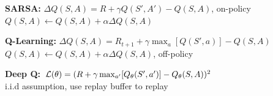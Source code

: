 \textbf{SARSA:} $\Delta Q(S,A) = R + \gamma Q(S', A') - Q(S, A)$, on-policy\\
$Q(S, A) \leftarrow Q(S, A) + \alpha \Delta Q(S, A)$\\

\textbf{Q-Learning:} $\Delta Q(S,A) = R_{t+1} + \gamma \max_a[Q(S', a)] - Q(S, A)$\\
$Q(S,A) \leftarrow Q(S, A) + \alpha \Delta Q(S, A)$, off-policy\\

\textbf{Deep Q:} $\mathcal{L}(\theta) = (R + \gamma \max_{a'}[Q_\theta(S', a')] - Q_\theta(S,A))^2$\\
i.i.d assumption, use replay buffer to replay

